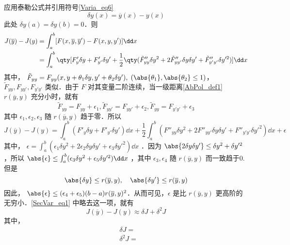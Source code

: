 应用泰勒公式并引用符号\autoref{Varia_eq6}~
\begin{equation}
\delta y(x)=\overline{y}(x)-y(x)
\end{equation}
此处 $\delta y(a)=\delta y(b)=0$．则
\begin{equation}
\begin{aligned}
J(\overline{y})-J(y)&=\int_a^b[F(x,\overline{y},\overline{y}')-F(x,y,y')]\dd x\\
&=\int_a^b\qty[F'_y\delta y+F'_{y'}\delta y'+\frac{1}{2}\qty(\tilde{F}''_{yy}\delta y^2+2\tilde{F}''_{yy'}\delta y\delta y'+\tilde{F}''_{y'y'}\delta y'^2)]\dd x
\end{aligned}
\end{equation}
其中， $\tilde{F}_{yy}=F_{yy}(x,y+\theta_1\delta y,y'+\theta_2\delta y'),\;(\abs{\theta_1},\abs{\theta_2}\leq1)$，$\tilde{F}_{yy},F_{yy'},F_{y'y'}$ 类似．由于 $F$ 对其变量二阶连续，当一级距离\autoref{AbPol_def1}~ $r(\overline{y},y)$ 充分小时，就有
\begin{equation}
\tilde F_{yy}=F_{yy}+\epsilon_1,\tilde F_{yy'}=F_{yy'}+\epsilon_2,\tilde F_{yy}=F_{y'y'}+\epsilon_3
\end{equation}
其中 $\epsilon_1,\epsilon_2,\epsilon_3$ 随 $r(\overline{y},y)$ 趋于零．所以
\begin{equation}\label{SecVar_eq1}
J(\overline{y})-J(y)=\int_a^b(F'_y\delta y+F'_{y'}\delta y')\dd x+\frac{1}{2}\int_a^b(F''_{yy}\delta y^2+2F''_{yy'}\delta y\delta y'+F''_{y'y'}\delta y'^2)\dd x+\epsilon
\end{equation}
其中， $\epsilon=\int_a^b(\epsilon_1\delta y^2+2\epsilon_2\delta y\delta y'+\epsilon_3\delta y'^2)\dd x$
．因为 $\abs{2\delta y\delta y'}\leq \delta y^2+\delta y'^2$，所以 $\abs{\epsilon}\leq \int_a^b(\epsilon_3\delta y^2+\epsilon_5\delta y'^2)\dd x$ ，其中 $\epsilon_3,\epsilon_4$ 随 $r(\overline{y},y)$ 而一致趋于0.但是
\begin{equation}
\abs{\delta y}\leq r(\overline{y},y),\quad \abs{\delta y'}\leq r(\overline{y},y)
\end{equation}
因此， $\abs{\epsilon}\leq (\epsilon_4+\epsilon_5)(b-a)r(\overline{y},y)^2$．从而可见，$\epsilon$ 是比 $r(\overline{y},y)$ 更高阶的无穷小．\autoref{SecVar_eq1} 中略去这一项，就有
\begin{equation}
J(\overline{y})-J(y)\approx\delta J+\delta^2J
\end{equation}
其中，
\begin{equation}
\begin{aligned}
&\delta J=\\
&\delta^2 J=
\end{aligned}
\end{equation}
